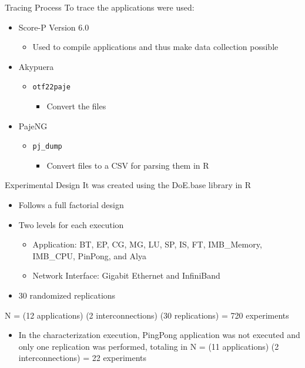 \documentclass{beamer}
\begin{document}
\begin{frame}{Tracing Process}
To trace the applications were used:
\pause \vfill
    \begin{itemize}
        \item Score-P Version 6.0
        \begin{itemize}
            \item Used to compile applications and thus make data collection possible
        \end{itemize}
    \pause \vfill
        \item Akypuera
        \begin{itemize}
            \item \texttt{otf22paje}
                \begin{itemize}
                    \item Convert the files
                \end{itemize}
        \end{itemize}
    \pause \vfill
        \item PajeNG
        \begin{itemize}
            \item \texttt{pj\_dump}
                \begin{itemize}
                    \item Convert files to a CSV for parsing them in R
                \end{itemize}
        \end{itemize}
    \end{itemize}
\end{frame}


\begin{frame}{Experimental Design}
It was created using the DoE.base library in R
\begin{itemize}
    \item Follows a full factorial design
    \item Two levels for each execution
 \begin{itemize}
\item Application: \alert{BT}, \alert{EP}, \alert{CG}, \alert{MG}, \alert{LU}, \alert{SP}, \alert{IS}, \alert{FT}, \alert{IMB\_Memory}, \alert{IMB\_CPU}, \alert{PinPong}, and \alert{Alya}
\item Network Interface: \alert{Gigabit Ethernet} and \alert{InfiniBand}
\end{itemize}
    \item 30 randomized replications
   \end{itemize}
N = (12 applications) \texttimes{} (2 interconnections) \texttimes{} (30 replications) = 720 experiments
\pause \begin{itemize}
    \item In the characterization execution, PingPong application was not executed and only one replication was performed, totaling in N = (11 applications) \texttimes{} (2 interconnections) = 22 experiments  

\end{itemize}
\end{frame}
\end{document}
